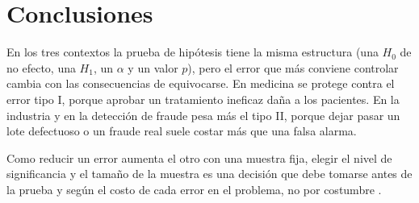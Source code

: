 \documentclass[11pt,letterpaper]{article}
\begin{document}
\section{Conclusiones}

En los tres contextos la prueba de hipótesis tiene la misma estructura (una $H_0$ de no efecto, una $H_1$, un $\alpha$ y un valor $p$), pero el error que más conviene controlar cambia con las consecuencias de equivocarse. En medicina se protege contra el error tipo I, porque aprobar un tratamiento ineficaz daña a los pacientes. En la industria y en la detección de fraude pesa más el tipo II, porque dejar pasar un lote defectuoso o un fraude real suele costar más que una falsa alarma.

Como reducir un error aumenta el otro con una muestra fija, elegir el nivel de significancia y el tamaño de la muestra es una decisión que debe tomarse antes de la prueba y según el costo de cada error en el problema, no por costumbre \parencite{tecnm2026_documento_fuente}.

\end{document}
